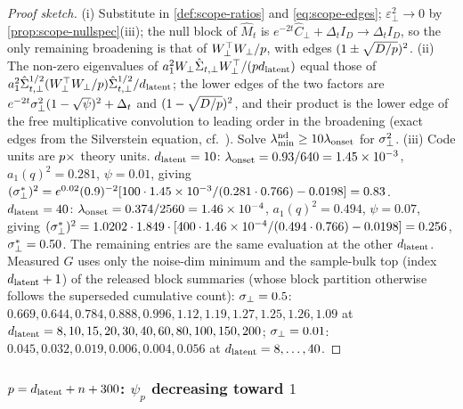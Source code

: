 \begin{proof}[Proof sketch]
(i) Substitute in \cref{def:scope-ratios} and \eqref{eq:scope-edges}; $\varepsilon_\perp^2\to0$ by \cref{prop:scope-nullspec}(iii); the null block of $\hat M_t$ is $e^{-2t}\hat C_\perp+\Delta_tI_D\to\Delta_tI_D$, so the only remaining broadening is that of $W_\perp^\top W_\perp/p$, with edges $(1\pm\sqrt{D/p})^2$. (ii) The non-zero eigenvalues of $a_1^2W_\perp\hat\Sigma_{t,\perp}W_\perp^\top/(pd_{\mathrm{latent}})$ equal those of $a_1^2\hat\Sigma_{t,\perp}^{1/2}(W_\perp^\top W_\perp/p)\hat\Sigma_{t,\perp}^{1/2}/d_{\mathrm{latent}}$; the lower edges of the two factors are $e^{-2t}\sigma_{\perp}^2(1-\sqrt\psi)^2+\Delta_t$ and $(1-\sqrt{D/p})^2$, and their product is the lower edge of the free multiplicative convolution to leading order in the broadening (exact edges from the Silverstein equation, cf.\ \citealp{ELKaroui2010spectrum}). Solve $\lambda^{\rm nd}_{\min}\ge10\lambda_{\rm onset}$ for $\sigma_{\perp}^2$. (iii) Code units are $p\times$ theory units. $d_{\mathrm{latent}}=10$: $\lambda_{\rm onset}=0.93/640=1.45\times10^{-3}$, $a_1(q)^2=0.281$, $\psi=0.01$, giving $(\sigma_{\perp}^*)^2=e^{0.02}(0.9)^{-2}[100\cdot1.45\times10^{-3}/(0.281\cdot0.766)-0.0198]=0.83$. $d_{\mathrm{latent}}=40$: $\lambda_{\rm onset}=0.374/2560=1.46\times10^{-4}$, $a_1(q)^2=0.494$, $\psi=0.07$, giving $(\sigma_{\perp}^*)^2=1.0202\cdot1.849\cdot[400\cdot1.46\times10^{-4}/(0.494\cdot0.766)-0.0198]=0.256$, $\sigma_{\perp}^*=0.50$. The remaining entries are the same evaluation at the other $d_{\mathrm{latent}}$. Measured $G$ uses only the noise-dim minimum and the sample-bulk top (index $d_{\mathrm{latent}}+1$) of the released block summaries (whose block partition otherwise follows the superseded cumulative count): $\sigma_{\perp}=0.5$: $0.669,0.644,0.784,0.888,0.996,1.12,1.19,1.27,1.25,1.26,1.09$ at $d_{\mathrm{latent}}=8,10,15,20,30,40,60,80,100,150,200$; $\sigma_{\perp}=0.01$: $0.045,0.032,0.019,0.006,0.004,0.056$ at $d_{\mathrm{latent}}=8,\dots,40$.
\end{proof}

\subsubsection{$p=d_{\mathrm{latent}}+n+300$: $\psi_p$ decreasing toward $1$}

